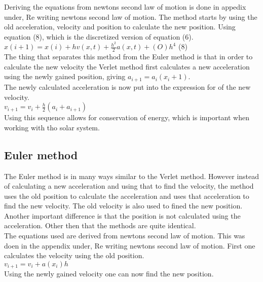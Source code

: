 \documentclass{article}
\begin{document}
    Deriving the equations from newtons second law of motion is done in appedix under, Re writing newtons second law of motion. The method starts by using the old acceleration, velocity and position to calculate the new position. Using equation (8), which is the discretized version of equation (6). \\

    $x(i+1) = x(i) + h v(x,t) + \frac{h^{2}}{2} a(x,t) + (O)h^{4}$ (8)\\

    The thing that separates this method from the Euler method is that in order to calculate the new velocity the Verlet method first calculates a new acceleration using the newly gained position, giving $a_{i+1} = a_i (x_i+1)$. \\

    The newly calculated acceleration is now put into the expression for of the new velocity. \\

    $v_{i+1} = v_i + \frac{h}{2} (a_i+a_{i+1})  $ \\

    Using this sequence allows for conservation of energy, which is important when working with tho solar system. \\

\subsection{Euler method}

    The Euler method is in many ways similar to the Verlet method. However instead of calculating a new acceleration and using that to find the velocity, the method uses the old position to calculate the acceleration and uses that acceleration to find the new velocity. The old velocity is also used to fined the new position. Another important difference is that the position is not calculated using the acceleration. Other then that the methods are quite identical. \\

    The equations used are derived from newtons second law of motion. This was doen in the appendix under, Re writing newtons second law of motion.
    First one calculates the velocity using the old position. \\

    $v_{i+1} = v_i +  a(x_i)h$ \\

    Using the newly gained velocity one can now find the new position. \\
\end{document}
